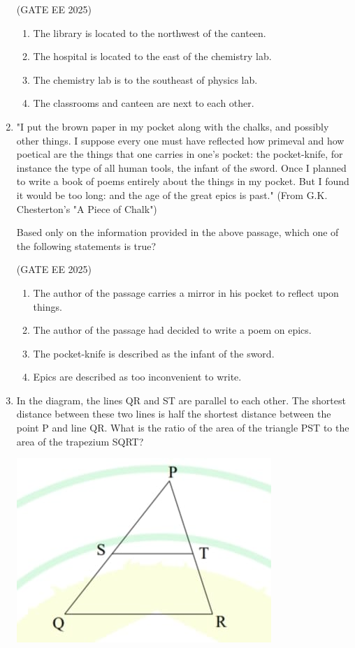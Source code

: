 \documentclass[journal,12pt,onecolumn]{IEEEtran}
\theoremstyle{remark}
\begin{document}
\begin{enumerate}
\hfill(GATE EE 2025)

\begin{enumerate}
\item The library is located to the northwest of the canteen.
\item The hospital is located to the east of the chemistry lab.
\item The chemistry lab is to the southeast of physics lab.
\item The classrooms and canteen are next to each other.
\end{enumerate}

\item "I put the brown paper in my pocket along with the chalks, and possibly other things. 
I suppose every one must have reflected how primeval and how poetical are the things that one carries in one's pocket: the pocket-knife, for instance the type of all human tools, the infant of the sword. Once I planned to write a book of poems entirely about the things in my pocket. But I found it would be too long: and the age of the great epics is past."  
(From G.K. Chesterton's "A Piece of Chalk")  

Based only on the information provided in the above passage, which one of the following statements is true?

\hfill(GATE EE 2025)

\begin{enumerate}
\item The author of the passage carries a mirror in his pocket to reflect upon things.
\item The author of the passage had decided to write a poem on epics.
\item The pocket-knife is described as the infant of the sword.
\item Epics are described as too inconvenient to write.
\end{enumerate}

\item In the diagram, the lines QR and ST are parallel to each other. 
The shortest distance between these two lines is half the shortest distance between the point P and line QR. 
What is the ratio of the area of the triangle PST to the area of the trapezium SQRT?

    \includegraphics[width=0.3\linewidth]{figs/Fig 7.jpg}


\end{enumerate}
\end{document}
